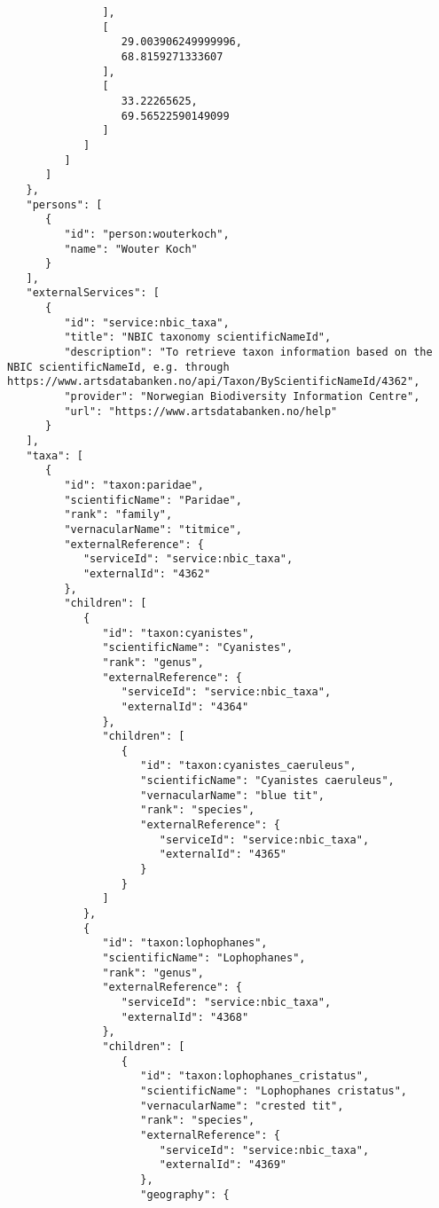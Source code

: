 \documentclass[10pt,letterpaper]{article}
\begin{document}
\begin{verbatim}
               ],
               [
                  29.003906249999996,
                  68.8159271333607
               ],
               [
                  33.22265625,
                  69.56522590149099
               ]
            ]
         ]
      ]
   },
   "persons": [
      {
         "id": "person:wouterkoch",
         "name": "Wouter Koch"
      }
   ],
   "externalServices": [
      {
         "id": "service:nbic_taxa",
         "title": "NBIC taxonomy scientificNameId",
         "description": "To retrieve taxon information based on the
NBIC scientificNameId, e.g. through
https://www.artsdatabanken.no/api/Taxon/ByScientificNameId/4362",
         "provider": "Norwegian Biodiversity Information Centre",
         "url": "https://www.artsdatabanken.no/help"
      }
   ],
   "taxa": [
      {
         "id": "taxon:paridae",
         "scientificName": "Paridae",
         "rank": "family",
         "vernacularName": "titmice",
         "externalReference": {
            "serviceId": "service:nbic_taxa",
            "externalId": "4362"
         },
         "children": [
            {
               "id": "taxon:cyanistes",
               "scientificName": "Cyanistes",
               "rank": "genus",
               "externalReference": {
                  "serviceId": "service:nbic_taxa",
                  "externalId": "4364"
               },
               "children": [
                  {
                     "id": "taxon:cyanistes_caeruleus",
                     "scientificName": "Cyanistes caeruleus",
                     "vernacularName": "blue tit",
                     "rank": "species",
                     "externalReference": {
                        "serviceId": "service:nbic_taxa",
                        "externalId": "4365"
                     }
                  }
               ]
            },
            {
               "id": "taxon:lophophanes",
               "scientificName": "Lophophanes",
               "rank": "genus",
               "externalReference": {
                  "serviceId": "service:nbic_taxa",
                  "externalId": "4368"
               },
               "children": [
                  {
                     "id": "taxon:lophophanes_cristatus",
                     "scientificName": "Lophophanes cristatus",
                     "vernacularName": "crested tit",
                     "rank": "species",
                     "externalReference": {
                        "serviceId": "service:nbic_taxa",
                        "externalId": "4369"
                     },
                     "geography": {

\end{verbatim}
\end{document}

